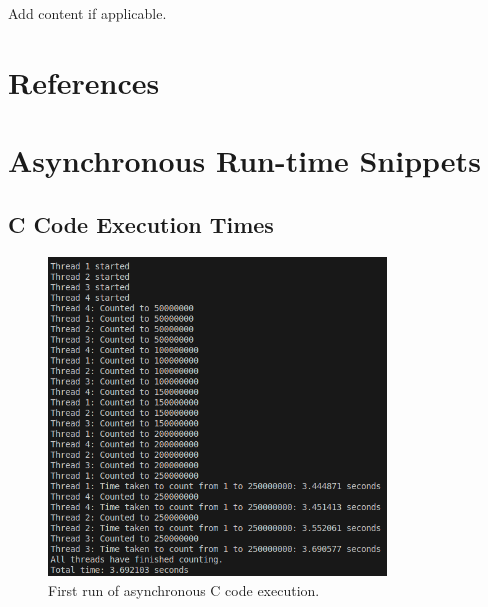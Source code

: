 \documentclass[12pt,a4paper]{article}
\begin{document}
Add content if applicable.

\newpage
\section{References}
\printbibliography

\clearpage
\appendix

\section{Asynchronous Run-time Snippets}

\subsection{C Code Execution Times} 

\begin{figure}[htbp]
    \centering
    \includegraphics[width=0.8\textwidth]{../async_records/results_c/result_1.png}
    \caption{First run of asynchronous C code execution.}
    \label{fig:C-async-runtime-1}
\end{figure}
\end{document}
